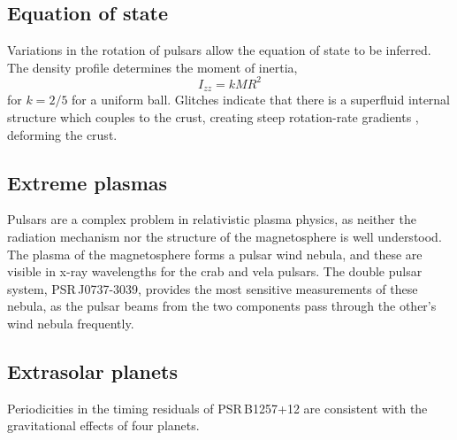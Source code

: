 \subsection{Equation of state}
\label{sec:equation-state}

Variations in the rotation of pulsars allow the equation of state to
be inferred. The density profile determines the moment of inertia,
\[ I_{zz} = kMR^2 \] for $k=2/5$ for a uniform ball. Glitches indicate
that there is a superfluid internal structure which couples to the
crust, creating steep rotation-rate gradients , deforming the crust.

\subsection{Extreme plasmas}
\label{sec:extreme-plasmas}

Pulsars are a complex problem in relativistic plasma physics, as
neither the radiation mechanism nor the structure of the magnetosphere
is well understood. The plasma of the magnetosphere forms a pulsar
wind nebula, and these are visible in x-ray wavelengths for the crab
and vela pulsars. The double pulsar system, PSR\,J0737-3039, provides
the most sensitive measurements of these nebula, as the pulsar beams
from the two components pass through the other's wind nebula
frequently.

\subsection{Extrasolar planets}
\label{sec:extrasolar-planets}

Periodicities in the timing residuals of PSR\,B1257+12 are consistent
with the gravitational effects of four planets.


